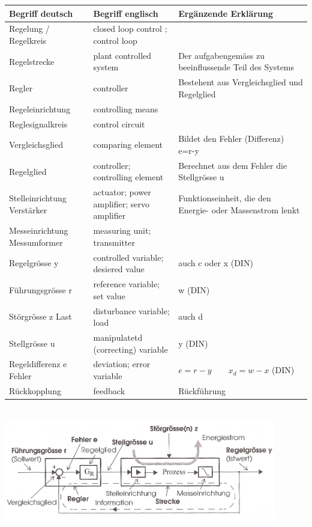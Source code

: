 	\begin{tabular}{|p{2.7cm}|p{5.4cm}|l|}
    	\hline
    	{\bf Begriff deutsch}		&{\bf Begriff englisch}	&{\bf Ergänzende
    	Erklärung}\\
		\hline
		Regelung /
		Regelkreis			& closed loop control ; control loop & \\
		\hline
		Regelstrecke
    				&plant controlled system	&Der aufgabengemäss zu beeinflussende
    	Teil des Systems\\
    	\hline
    	Regler				&controller			&Bestehent aus Vergleichsglied und Regelglied\\
    	\hline
    	Regeleinrichtung	&controlling means&\\
    	\hline
    	Reglesignalkreis	&control circuit&\\
    	\hline
    	Vergleichsglied		&comparing element	&Bildet den Fehler (Differenz)
    											e=r-y\\
    	\hline
    	Regelglied			&controller;
    						controlling element	&Berechnet aus dem Fehler die Stellgrösse u\\
    	\hline
    	Stelleinrichtung
    	Verstärker			&actuator;
					    	power amplifier;
    						servo amplifier		&Funktionseinheit, die den Energie- oder Massenstrom
    											lenkt\\
    	\hline
    	Messeinrichtung
    	Messumformer		&measuring unit;
    						transmitter&\\
    	\hline
    	Regelgrösse y		&controlled variable;
    						desiered value& auch c oder x (DIN)\\
    	\hline
    	Führungsgrösse r	&reference variable;
    						set value& w (DIN)\\
    	\hline
    	Störgrösse z Last	&disturbance variable;
    						load& auch d\\
    	\hline
    	Stellgrösse u		&manipulatetd (correcting)
    						variable& y (DIN)\\
    	\hline
    	Regeldifferenz e
    	Fehler				&deviation;
    						error variable		&$e=r-y \quad \quad x_d=w-x$ (DIN) \\
    	\hline
    	Rückkopplung		&feedback			&Rückführung\\
    	\hline

	\end{tabular}\\
\includegraphics[height=4.5cm]{./bilder/Grundregelkreis_klein.jpg}


